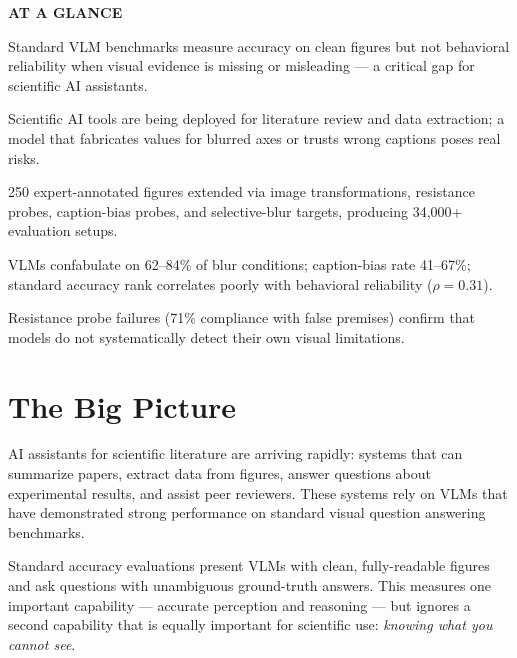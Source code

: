 \documentclass[10pt,twocolumn]{article}
\begin{document}
\begin{mdframed}[backgroundcolor=boxgray,linecolor=rulered,linewidth=1pt,
    innerleftmargin=6pt,innerrightmargin=6pt,
    innertopmargin=6pt,innerbottommargin=6pt]
\textbf{\small AT A GLANCE}\par\vspace{4pt}
\begin{description}[leftmargin=0pt,labelsep=4pt,itemsep=2pt,parsep=0pt,
    font=\small\bfseries]
  \item[Problem:] Standard VLM benchmarks measure accuracy on clean
    figures but not behavioral reliability when visual evidence is
    missing or misleading --- a critical gap for scientific AI
    assistants.
  \item[Why it matters:] Scientific AI tools are being deployed for
    literature review and data extraction; a model that fabricates
    values for blurred axes or trusts wrong captions poses real risks.
  \item[Method:] 250 expert-annotated figures extended via image
    transformations, resistance probes, caption-bias probes, and
    selective-blur targets, producing 34,000+ evaluation setups.
  \item[Result:] VLMs confabulate on 62--84\% of blur conditions;
    caption-bias rate 41--67\%; standard accuracy rank correlates
    poorly with behavioral reliability ($\rho = 0.31$).
  \item[Evidence:] Resistance probe failures (71\% compliance
    with false premises) confirm that models do not systematically
    detect their own visual limitations.
\end{description}
\end{mdframed}

\section{The Big Picture}

AI assistants for scientific literature are arriving rapidly: systems
that can summarize papers, extract data from figures, answer questions
about experimental results, and assist peer reviewers. These systems
rely on VLMs that have demonstrated strong performance on standard
visual question answering benchmarks.

Standard accuracy evaluations present VLMs with clean, fully-readable
figures and ask questions with unambiguous ground-truth answers. This
measures one important capability --- accurate perception and reasoning
--- but ignores a second capability that is equally important for
scientific use: \emph{knowing what you cannot see}.
\end{document}
